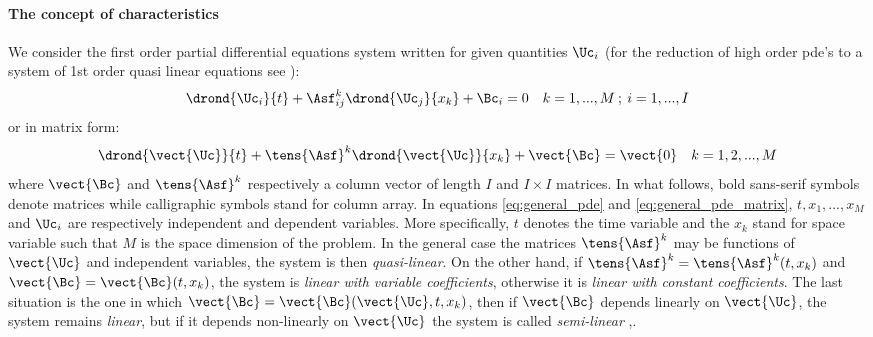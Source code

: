 \paragraph{The concept of characteristics}
\cite[p.55]{Courant}
We consider the first order partial differential equations system written for given quantities $\Uc_i$ (for the reduction of high order pde's to a system of 1st order quasi linear equations see \cite[Chapter~1 -- Section~7 -- p.40]{Courant}):
\begin{equation}
  \label{eq:general_pde}
  \drond{\Uc_i}{t} + \Asf^k_{ij}\drond{\Uc_j}{x_k} + \Bc_i= 0 \quad k=1,...,M \:;\: i=1,...,I
\end{equation}
or in matrix form:
\begin{equation}
  \label{eq:general_pde_matrix}
  \drond{\vect{\Uc}}{t} + \tens{\Asf}^k \drond{\vect{\Uc}}{x_k} + \vect{\Bc} = \vect{0}\quad k=1,2,...,M
\end{equation}
where $\vect{\Bc}$ and $\tens{\Asf}^k$ respectively a column vector of length $I$ and $I\times I$ matrices. In what follows, bold sans-serif symbols denote matrices while calligraphic symbols stand for column array. In equations \ref{eq:general_pde} and \ref{eq:general_pde_matrix}, $t,x_1,...,x_M$ and $\Uc_i$ are respectively independent and dependent variables. More specifically, $t$ denotes the time variable and the $x_k$ stand for space variable such that $M$ is the space dimension of the problem. In the general case the matrices $\tens{\Asf}^k$ may be functions of $\vect{\Uc}$ and independent variables, the system is then \textit{quasi-linear}. On the other hand, if $\tens{\Asf}^k=\tens{\Asf}^k(t,x_k)$ and $\vect{\Bc}=\vect{\Bc}(t,x_k)$, the system is \textit{linear with variable coefficients}, otherwise it is \textit{linear with constant coefficients}. The last situation is the one in which $\vect{\Bc}=\vect{\Bc}(\vect{\Uc},t,x_k)$, then if $\vect{\Bc}$ depends linearly on $\vect{\Uc}$, the system remains \textit{linear}, but if it depends non-linearly on $\vect{\Uc}$ the system is called \textit{semi-linear} \cite[Chapter~5]{Courant},\cite[Chapter~2]{Toro}.

